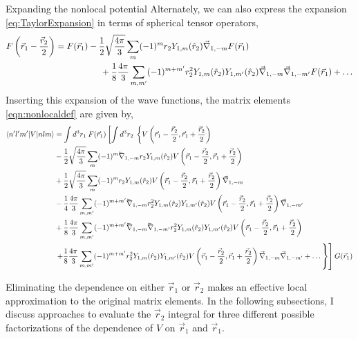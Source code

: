 \begin{section}{Expanding the nonlocal potential}
Alternately, we can also express the expansion \eqref{eq:TaylorExpansion} in terms of spherical tensor operators,
\begin{align}
\begin{split}
F\left(\vec{r}_1-\frac{\vec{r}_2}{2}\right)=
F(\vec{r}_1)&-\frac{1}{2}\sqrt{\frac{4\pi}{3}}\sum_{m}(-1)^m r_2 Y_{1,m}(\hat{r}_2) \vec{\nabla}_{1,-m} F(\vec{r}_1) \\
&\hspace{.5cm}+\frac{1}{8}\frac{4\pi}{3}\sum_{m,m'}(-1)^{m+m'}r_2^2 Y_{1,m}(\hat{r}_2)Y_{1,m'}(\hat{r}_2)\vec{\nabla}_{1,-m}\vec{\nabla}_{1,-m'}F(\vec{r}_1)
+\dots 
\end{split}
\end{align}
Inserting this expansion of the wave functions, the matrix elements \eqref{eqn:nonlocaldef} are given by,
\begin{equation}\label{eqn:expansionSpherical}
\begin{split}
\braket{n' l' m'| V | n l m} &= \int d^3r_1\: F(\vec{r}_1)\left[\int d^3r_2\:\left\{V\left(\vec{r}_1-\frac{\vec{r}_2}{2},\vec{r}_1+\frac{\vec{r}_2}{2}\right) \right.\right. \\
&-\frac{1}{2}\sqrt{\frac{4\pi}{3}}\sum_m (-1)^m \lvec{\nabla}_{1,-m} r_2Y_{1,m}(\hat{r}_2)V\left(\vec{r}_1-\frac{\vec{r}_2}{2},\vec{r}_1+\frac{\vec{r}_2}{2}\right)\\
&+\frac{1}{2}\sqrt{\frac{4\pi}{3}}\sum_m (-1)^m r_2Y_{1,m}(\hat{r}_2)V\left(\vec{r}_1-\frac{\vec{r}_2}{2},\vec{r}_1+\frac{\vec{r}_2}{2}\right) \vec{\nabla}_{1,-m} \\
&-\frac{1}{4}\frac{4\pi}{3}\sum_{m,m'}(-1)^{m+m'}\lvec{\nabla}_{1,-m} r_2^2 Y_{1,m}(\hat{r}_2)Y_{1,m'}(\hat{r}_2)V\left(\vec{r}_1-\frac{\vec{r}_2}{2},\vec{r}_1+\frac{\vec{r}_2}{2}\right) \vec{\nabla}_{1,-m'}\\
&+\frac{1}{8}\frac{4\pi}{3}\sum_{m,m'}(-1)^{m+m'}\lvec{\nabla}_{1,-m}\lvec{\nabla}_{1,-m'} r_2^2 Y_{1,m}(\hat{r}_2)Y_{1,m'}(\hat{r}_2)V\left(\vec{r}_1-\frac{\vec{r}_2}{2},\vec{r}_1+\frac{\vec{r}_2}{2}\right) \\
&\left.\left.+\frac{1}{8}\frac{4\pi}{3}\sum_{m,m'}(-1)^{m+m'} r_2^2 Y_{1,m}(\hat{r}_2)Y_{1,m'}(\hat{r}_2)V\left(\vec{r}_1-\frac{\vec{r}_2}{2},\vec{r}_1+\frac{\vec{r}_2}{2}\right)\vec{\nabla}_{1,-m}\vec{\nabla}_{1,-m'}+\dots \right\}\right]G(\vec{r}_1)
\end{split}
\end{equation}

Eliminating the dependence on either $\vec{r}_1$ or $\vec{r}_2$ makes an effective local approximation to the original matrix elements. In the following subsections, I discuss approaches to evaluate the $\vec{r}_2$ integral for three different possible factorizations of the dependence of $V$ on $\vec{r}_1$ and  $\vec{r}_1$.


\end{section}

